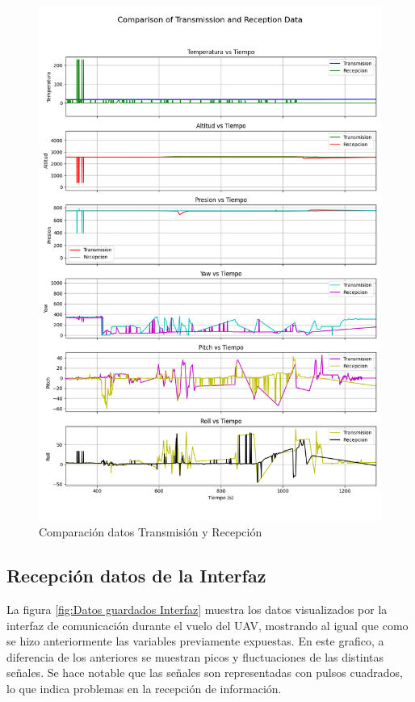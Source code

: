 \begin{figure}[H]
    \centering
    \includegraphics[width=\textwidth]{Imagenes/Vuelo/comparison_subplots.png}
    \caption{Comparación datos Transmisión y Recepción}
    \label{fig:comparacion transmision y recepcion}
\end{figure}

\subsection{Recepción datos de la Interfaz}


La figura  \ref{fig:Datos guardados Interfaz} muestra los datos visualizados por la interfaz de comunicación durante el vuelo del UAV, mostrando al igual que como se hizo anteriormente las variables previamente expuestas. En este grafico, a diferencia de los anteriores se muestran picos y fluctuaciones de las distintas señales. Se hace notable que las señales son representadas con pulsos cuadrados, lo que indica problemas en la recepción de información. \\

